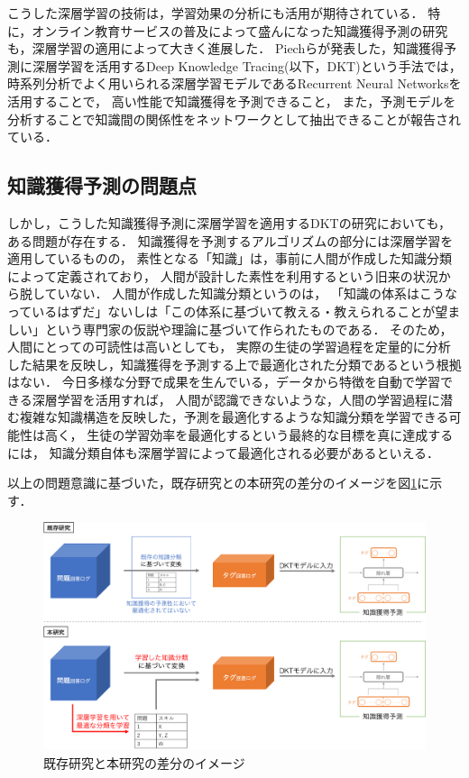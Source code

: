 こうした深層学習の技術は，学習効果の分析にも活用が期待されている．
特に，オンライン教育サービスの普及によって盛んになった知識獲得予測の研究も，深層学習の適用によって大きく進展した．
Piechらが発表した，知識獲得予測に深層学習を活用するDeep Knowledge Tracing(以下，DKT)という手法では，
時系列分析でよく用いられる深層学習モデルであるRecurrent Neural Networks\cite{williams1989learning}を活用することで，
高い性能で知識獲得を予測できること，
また，予測モデルを分析することで知識間の関係性をネットワークとして抽出できることが報告されている\cite{piech2015deep}．


\subsection{知識獲得予測の問題点}

しかし，こうした知識獲得予測に深層学習を適用するDKTの研究においても，ある問題が存在する．
知識獲得を予測するアルゴリズムの部分には深層学習を適用しているものの，
素性となる「知識」は，事前に人間が作成した知識分類によって定義されており，
人間が設計した素性を利用するという旧来の状況から脱していない．
人間が作成した知識分類というのは，
「知識の体系はこうなっているはずだ」ないしは「この体系に基づいて教える・教えられることが望ましい」という専門家の仮説や理論に基づいて作られたものである．
そのため，人間にとっての可読性は高いとしても，
実際の生徒の学習過程を定量的に分析した結果を反映し，知識獲得を予測する上で最適化された分類であるという根拠はない．
今日多様な分野で成果を生んでいる，データから特徴を自動で学習できる深層学習を活用すれば，
人間が認識できないような，人間の学習過程に潜む複雑な知識構造を反映した，予測を最適化するような知識分類を学習できる可能性は高く，
生徒の学習効率を最適化するという最終的な目標を真に達成するには，
知識分類自体も深層学習によって最適化される必要があるといえる．


以上の問題意識に基づいた，既存研究との本研究の差分のイメージを図\ref{fig:problem}に示す．
\begin{figure}[htb]
\begin{center}
\includegraphics[width=400pt]{./img/problem3.png}
\end{center}
\caption{既存研究と本研究の差分のイメージ}
\label{fig:problem}
\end{figure}


